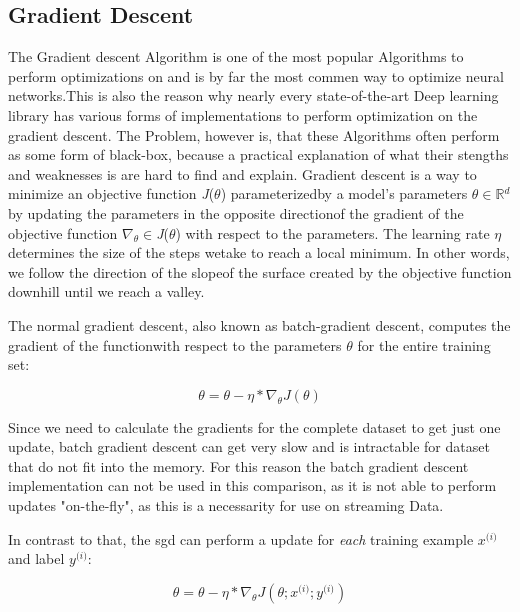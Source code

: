 \documentclass[12pt,oneside,a4paper,parskip]{scrbook}
\newcommand{\R}{\mathbb{R}}
\begin{document}
\pagebreak

\subsection{Gradient Descent}
The Gradient descent Algorithm is one of the most popular Algorithms to perform optimizations on and is by far the most 
commen way to optimize neural networks.This is also the reason why nearly every state-of-the-art Deep learning library 
has various forms of implementations to perform optimization on the gradient descent. The Problem, however is, that these
Algorithms often perform as some form of black-box, because a practical explanation of what their stengths and weaknesses 
is are hard to find and explain.
Gradient descent is a way to minimize an objective function \textit{J}($\theta$) parameterizedby a model's parameters $\theta \in \R{}^d$ by 
updating the parameters in the opposite directionof the gradient of the objective function $\nabla_\theta \in $\textit{J}($\theta$) with respect to 
the parameters. The learning rate $\eta$ determines the size of the steps wetake to reach a local minimum. In other words, 
we follow the direction of the slopeof the surface created by the objective function downhill until we reach a valley. \cite{overvieDiffRSLVQ}

The normal gradient descent, also known as batch-gradient descent, computes the gradient of the functionwith 
respect to the parameters $\theta$ for the entire training set:

\begin{equation}
\theta = \theta - \eta * \nabla_\theta \textit{J}(\theta)
\end{equation}

Since we need to calculate the gradients for the complete dataset to get just one update, batch gradient descent can get very
slow and is intractable for dataset that do not fit into the memory. For this reason the batch gradient descent implementation can not be used in this comparison,
as it is not able to perform updates "on-the-fly", as this is a necessarity for use on streaming Data. 

In contrast to that, the \ac{sgd} can perform a update for \textit{each} training example
$\textit{x}^\textit{(i)}$ and label $\textit{y}^\textit{(i)}$:

\begin{equation}
\theta = \theta - \eta * \nabla_\theta \textit{J}(\theta;\textit{x}^\textit{(i)};\textit{y}^\textit{(i)})
\end{equation}
\end{document}
